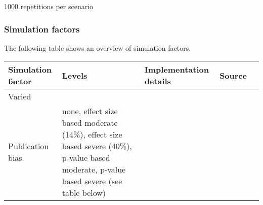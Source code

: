 \documentclass[english,doc,floatsintext]{apa6}
\begin{document}
1000 repetitions per scenario

\hypertarget{simulation-factors}{%
\subsubsection{Simulation factors}\label{simulation-factors}}

The following table shows an overview of simulation factors.

\begin{longtable}[]{@{}lllll@{}}
\toprule
\begin{minipage}[b]{0.20\columnwidth}\raggedright
Simulation factor\strut
\end{minipage} & \begin{minipage}[b]{0.35\columnwidth}\raggedright
Levels\strut
\end{minipage} & \begin{minipage}[b]{0.26\columnwidth}\raggedright
Implementation details\strut
\end{minipage} & \begin{minipage}[b]{0.04\columnwidth}\raggedright
Source\strut
\end{minipage} & \begin{minipage}[b]{0.01\columnwidth}\raggedright
\strut
\end{minipage}\tabularnewline
\midrule
\endhead
\begin{minipage}[t]{0.20\columnwidth}\raggedright
Varied\strut
\end{minipage} & \begin{minipage}[t]{0.35\columnwidth}\raggedright
\strut
\end{minipage} & \begin{minipage}[t]{0.26\columnwidth}\raggedright
\strut
\end{minipage} & \begin{minipage}[t]{0.04\columnwidth}\raggedright
\strut
\end{minipage} & \begin{minipage}[t]{0.01\columnwidth}\raggedright
\strut
\end{minipage}\tabularnewline
\begin{minipage}[t]{0.20\columnwidth}\raggedright
Publication bias\strut
\end{minipage} & \begin{minipage}[t]{0.35\columnwidth}\raggedright
none, effect size based moderate (14\%), effect size based severe (40\%), p-value based moderate, p-value based severe (see table below)\strut
\end{minipage} & \begin{minipage}[t]{0.26\columnwidth}\raggedright

\end{minipage}
\end{longtable}
\end{document}
